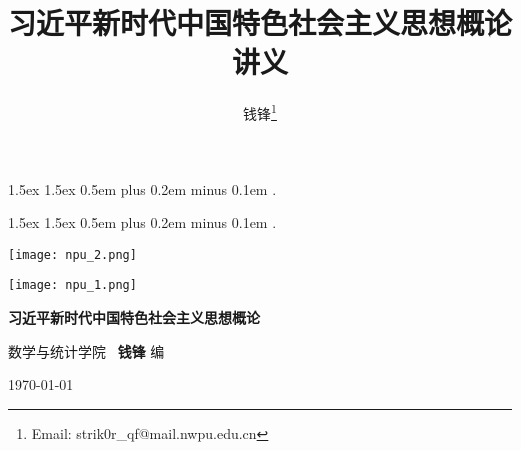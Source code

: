 \documentclass[UTF8,10pt]{ctexbook} %
\title{\textbf{习近平新时代中国特色社会主义思想概论}讲义}
\author{钱锋\thanks{Email: strik0r\_qf@mail.nwpu.edu.cn}}
\begin{document}
    {1.5ex}                                         %
    {1.5ex}                                         %
    {}                                              %
    {}                                              %
    {\bfseries}                                     %
    {}                                              %
    {0.5em plus 0.2em minus 0.1em}                  %
    {.}

\theoremstyle{mytheoremstyle} \newtheorem{example}{例}[section]
\theoremstyle{mytheoremstyle} \newtheorem{key}{核心要点}[section]

\theoremstyle{plain} \newtheorem{thm}{分析论述}

    {1.5ex}                                         %
    {1.5ex}                                         %
    {}                                              %
    {}                                              %
    {\kaishu}                                       %
    {}                                              %
    {0.5em plus 0.2em minus 0.1em}                  %
    {.}

\theoremstyle{my3theoremstyle}
\newtheorem*{remark}{注}
\newtheorem*{cmt}{评注}
\newtheorem*{sol}{答案要点}

\begin{titlepage}
    \thispagestyle{empty}
    \centering
        \vspace*{2cm}
        \texttt{[image: npu\_2.png]}\par
        \vspace{1cm}
        \texttt{[image: npu\_1.png]}\par
    \vspace{1cm}
        \begin{center}
            \Huge \heiti \textbf{习近平新时代中国特色社会主义思想概论}
        \end{center}
        \vspace{6cm}
        \begin{center}
        \songti
        \kaishu 数学与统计学院 \, \heiti\textbf{钱锋} \quad \songti 编
        \vspace{0.5cm}

    \today
    \end{center}
\end{titlepage}
\end{document}
